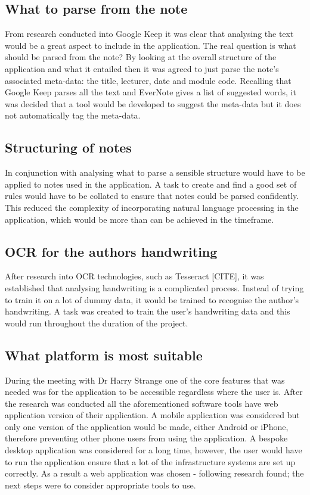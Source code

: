 \subsection{What to parse from the note}
From research conducted into Google Keep it was clear that analysing the text would be a great aspect to include in the application. The real question is what should be parsed from the note? By looking at the overall structure of the application and what it entailed then it was agreed to just parse the note's associated meta-data: the title, lecturer, date and module code. Recalling that Google Keep parses all the text and EverNote gives a list of suggested words, it was decided that a tool would be developed to suggest the meta-data but it does not automatically tag the meta-data.

\subsection{Structuring of notes}
In conjunction with analysing what to parse a sensible structure would have to be applied to notes used in the application. A task to create and find a good set of rules would have to be collated to ensure that notes could be parsed confidently. This reduced the complexity of incorporating natural language processing in the application, which would be more than can be achieved in the timeframe.


\subsection{OCR for the authors handwriting}
After research into OCR technologies, such as Tesseract [CITE], it was established that analysing handwriting is a complicated process. Instead of trying to train it on a lot of dummy data, it would be trained to recognise the author's handwriting. A task was created to train the user's handwriting data and this would run throughout the duration of the project.


\subsection{What platform is most suitable}
During the meeting with Dr Harry Strange one of the core features that was needed was for the application to be accessible regardless where the user is. After the research was conducted all the aforementioned software tools have web application version of their application. A mobile application was considered but only one version of the application would be made, either Android or iPhone, therefore preventing other phone users from using the application. A bespoke desktop application was considered for a long time, however, the user would have to run the application ensure that a lot of the infrastructure systems are set up correctly. As a result a web application was chosen - following research found; the next steps were to consider appropriate tools to use.

